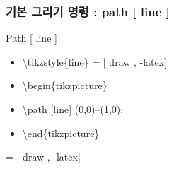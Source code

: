 \documentclass[ aspectratio=169,  10pt,blue,xcolor=pdftex,dvipsnames,table,handout,notes]{beamer}
\begin{document}
		\begin{frame}[t]
		\frametitle{기본 그리기 명령 : path [ line ]}

			\begin{block}{Path [ line ]}
			\end{block}


			\begin{example}
			\begin{itemize}
				\item[] \textbackslash tikzstyle\{line\} = [ draw , -latex]
				\item[] \textbackslash begin\{tikzpicture\}
				\item[] \textbackslash path [line] (0,0)--(1,0);
				\item[] \textbackslash end\{tikzpicture\}
			\end{itemize}
			\end{example}

			\begin{example}
				 = [ draw , -latex]
			\end{example}



		\note[item]{ }

		\end{frame}
\end{document}
